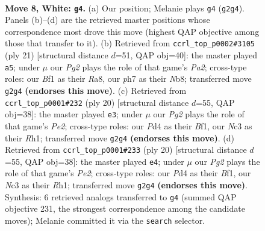 \documentclass[11pt]{article}
\begin{document}
\begin{figure}[p]\centering
\begin{subfigure}{0.46\textwidth}\centering
\resizebox{\linewidth}{!}{%
\newchessgame
\chessboard[
  setfen={rn1qkb1r/pp3ppp/2p2n2/3p4/3P4/2N2Q1P/PPP2PP1/R1B1KB1R w KQkq - 0 8},
  showmover=false,
  pgfstyle=straightmove, color=movearrow, markmove={g2-g4}
]}
\caption{}
\end{subfigure}\hfill
\begin{subfigure}{0.46\textwidth}\centering
\resizebox{\linewidth}{!}{%
\newchessgame
\chessboard[
  setfen={rnbr2k1/pp2pp1p/1q3bp1/3P4/4P3/1NN5/PP1Q1PPP/R3KB1R b KQ - 0 11},
  showmover=false,
  pgfstyle=straightmove, color=movearrow, markmove={a7-a5}
]}
\caption{}
\end{subfigure}
\\[4pt]
\begin{subfigure}{0.46\textwidth}\centering
\resizebox{\linewidth}{!}{%
\newchessgame
\chessboard[
  setfen={r3kb1r/ppq1pppp/1np2n2/8/2NP4/5QP1/PP2PP1P/R1B1KB1R w KQkq - 1 11},
  showmover=false,
  pgfstyle=straightmove, color=movearrow, markmove={e2-e3}
]}
\caption{}
\end{subfigure}\hfill
\begin{subfigure}{0.46\textwidth}\centering
\resizebox{\linewidth}{!}{%
\newchessgame
\chessboard[
  setfen={r3kb1r/ppq1pppp/1np2n2/8/2NP4/5QP1/PP2PP1P/R1B1KB1R w KQkq - 1 11},
  showmover=false,
  pgfstyle=straightmove, color=movearrow, markmove={e2-e4}
]}
\caption{}
\end{subfigure}
\caption{\textbf{Move 8, White: \texttt{g4}.} (a) Our position; Melanie plays \texttt{g4} (\texttt{g2g4}). Panels (b)--(d) are the retrieved master positions whose correspondence most drove this move (highest QAP objective among those that transfer to it). (b) Retrieved from \texttt{ccrl\_top\_p0002\#3105} (ply 21) [structural distance $d$=51, QAP obj=40]: the master played \texttt{a5}; under $\mu$ our \emph{Pg2} plays the role of that game's \emph{Pa2}; cross-type roles: our \emph{B}f1 as their \emph{R}a8, our \emph{p}h7 as their \emph{N}b8; transferred move \texttt{g2g4} \textbf{(endorses this move)}. (c) Retrieved from \texttt{ccrl\_top\_p0001\#232} (ply 20) [structural distance $d$=55, QAP obj=38]: the master played \texttt{e3}; under $\mu$ our \emph{Pg2} plays the role of that game's \emph{Pe2}; cross-type roles: our \emph{P}d4 as their \emph{B}f1, our \emph{N}c3 as their \emph{R}h1; transferred move \texttt{g2g4} \textbf{(endorses this move)}. (d) Retrieved from \texttt{ccrl\_top\_p0001\#233} (ply 20) [structural distance $d$=55, QAP obj=38]: the master played \texttt{e4}; under $\mu$ our \emph{Pg2} plays the role of that game's \emph{Pe2}; cross-type roles: our \emph{P}d4 as their \emph{B}f1, our \emph{N}c3 as their \emph{R}h1; transferred move \texttt{g2g4} \textbf{(endorses this move)}. Synthesis: 6 retrieved analogs transferred to \texttt{g4} (summed QAP objective 231, the strongest correspondence among the candidate moves); Melanie committed it via the \texttt{search} selector.}
\label{fig:thought-m14}
\end{figure}
\end{document}
